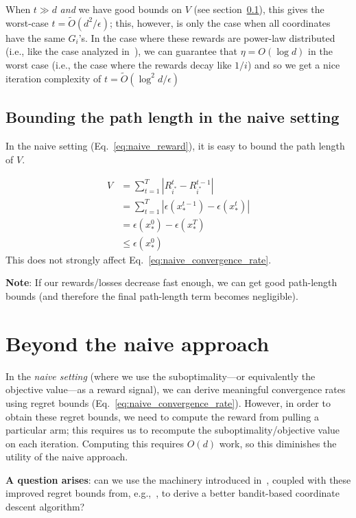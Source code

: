 \documentclass[letterpaper]{article}
\newcommand{\istar}{i^*}
\begin{document}
When $t \gg d$ \emph{and} we have good bounds on $V$ (see section~\ref{section:naive_bounding_path_length}), this gives the worst-case $t = \tilde{O}(d^2/\epsilon)$; this, however, is only the case when all coordinates have the same $G_i$'s. In the case where these rewards are power-law distributed (i.e., like the case analyzed in~\cite{namkoong2017adaptive}), we can guarantee that $\eta = O(\log d)$ in the worst case (i.e., the case where the rewards decay like $1/i$) and so we get a nice iteration complexity of $t = \tilde{O}(\log^2 d / \epsilon)$

\subsection{Bounding the path length in the naive setting}
\label{section:naive_bounding_path_length}
In the naive setting (Eq.~\ref{eq:naive_reward}), it is easy to bound the path length of $V$. 

\begin{align}
    V &= \sum_{t=1}^T |R_{\istar}^t - R_{\istar}^{t-1}| \\
    &= \sum_{t=1}^T |\epsilon(x^{t-1}_*)-\epsilon(x^t_*)| \\
    &= \epsilon(x^0_*) - \epsilon(x^T_*)\\
    &\leq \epsilon(x^0_*)
\end{align}
This does not strongly affect Eq.~\ref{eq:naive_convergence_rate}.

\textbf{Note}: If our rewards/losses decrease fast enough, we can get good path-length bounds (and therefore the final path-length term becomes negligible).

\section{Beyond the naive approach}
In the \emph{naive setting} (where we use the suboptimality---or equivalently the objective value---as a reward signal), we can derive meaningful convergence rates using regret bounds (Eq.~\ref{eq:naive_convergence_rate}). However, in order to obtain these regret bounds, we need to compute the reward from pulling a particular arm; this requires us to recompute the suboptimality/objective value on each iteration. Computing this requires $O(d)$ work, so this diminishes the utility of the naive approach.

\textbf{A question arises}: can we use the machinery introduced in~\cite{salehi2018coordinate}, coupled with these improved regret bounds from, e.g.,~\cite{bubeck2019improved}, to derive a better bandit-based coordinate descent algorithm? 
\end{document}
